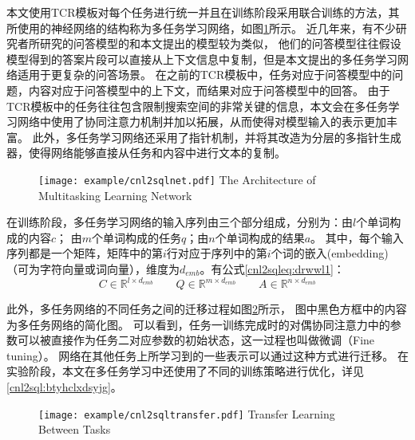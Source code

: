 本文使用TCR模板对每个任务进行统一并且在训练阶段采用联合训练的方法，其所使用的神经网络的结构称为多任务学习网络，如图\ref{fig:cnl2sqlnet}所示。
近几年来，有不少研究者所研究的问答模型\cite{wang2016machine,seo2016bidirectional,xiong2017dcn+}的和本文提出的模型较为类似，
他们的问答模型往往假设模型得到的答案片段可以直接从上下文信息中复制，但是本文提出的多任务学习网络适用于更复杂的问答场景。
在之前的TCR模板中，任务对应于问答模型中的问题，内容对应于问答模型中的上下文，而结果对应于问答模型中的回答。
由于TCR模板中的任务往往包含限制搜索空间的非常关键的信息，本文会在多任务学习网络中使用了协同注意力机制\cite{vaswani2017attention}并加以拓展，从而使得对模型输入的表示更加丰富。
此外，多任务学习网络还采用了指针机制\cite{vinyals2015pointer}，并将其改造为分层的多指针生成器，使得网络能够直接从任务和内容中进行文本的复制。

\begin{figure}[!htp]
  \centering
  \texttt{[image: example/cnl2sqlnet.pdf]}
    {The Architecture of Multitasking Learning Network}
  \label{fig:cnl2sqlnet}
\end{figure}

在训练阶段，多任务学习网络的输入序列由三个部分组成，分别为：由$l$个单词构成的内容$c$；
由$m$个单词构成的任务$q$；由$n$个单词构成的结果$a$。
其中，每个输入序列都是一个矩阵，矩阵中的第$i$行对应于序列中的第$i$个词的嵌入(embedding)（可为字符向量或词向量），维度为$d_{emb}$。有公式\ref{cnl2sqleq:drwwl1}：
\begin{equation}
    \label{cnl2sqleq:drwwl1}
    C \in \mathbb{R}^{l \times d_{emb}} \qquad Q \in \mathbb{R}^{m \times d_{emb}} \qquad A \in \mathbb{R}^{n \times d_{emb}}
  \end{equation}

此外，多任务网络的不同任务之间的迁移过程如图\ref{fig:cnl2sqltransfer}所示，
图中黑色方框中的内容为多任务网络的简化图。
可以看到，任务一训练完成时的对偶协同注意力中的参数可以被直接作为任务二对应参数的初始状态，这一过程也叫做微调（Fine tuning）。
网络在其他任务上所学习到的一些表示可以通过这种方式进行迁移。
在实验阶段，本文在多任务学习中还使用了不同的训练策略进行优化，详见\ref{cnl2sql:btyhclxdsyjg}。
  \begin{figure}[!htp]
    \centering
    \texttt{[image: example/cnl2sqltransfer.pdf]}
      {Transfer Learning Between Tasks}
    \label{fig:cnl2sqltransfer}
  \end{figure}

